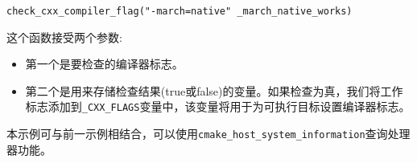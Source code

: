 \texttt{check\_cxx\_compiler\_flag("-march=native" \_march\_native\_works)}

这个函数接受两个参数:

\begin{itemize}
\item 第一个是要检查的编译器标志。

\item 第二个是用来存储检查结果(true或false)的变量。如果检查为真，我们将工作标志添加到\texttt{\_CXX\_FLAGS}变量中，该变量将用于为可执行目标设置编译器标志。

\end{itemize}


本示例可与前一示例相结合，可以使用\texttt{cmake\_host\_system\_information}查询处理器功能。


